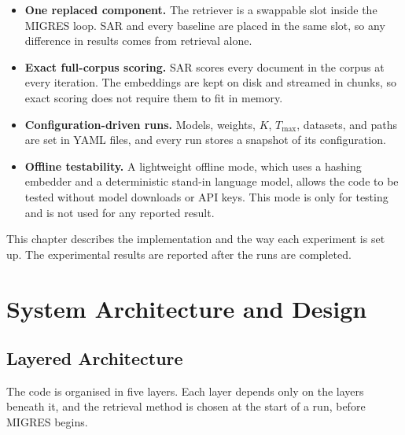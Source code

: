 \documentclass[12pt,a4paper]{report}
\begin{document}
\begin{itemize}[leftmargin=0.30in,itemsep=0.06in]
\item \textbf{One replaced component.} The retriever is a swappable slot inside the MIGRES loop. SAR and every baseline are placed in the same slot, so any difference in results comes from retrieval alone.
\item \textbf{Exact full-corpus scoring.} SAR scores every document in the corpus at every iteration. The embeddings are kept on disk and streamed in chunks, so exact scoring does not require them to fit in memory.
\item \textbf{Configuration-driven runs.} Models, weights, $K$, $T_{\max}$, datasets, and paths are set in YAML files, and every run stores a snapshot of its configuration.
\item \textbf{Offline testability.} A lightweight offline mode, which uses a hashing embedder and a deterministic stand-in language model, allows the code to be tested without model downloads or API keys. This mode is only for testing and is not used for any reported result.
\end{itemize}

This chapter describes the implementation and the way each experiment is set up. The experimental results are reported after the runs are completed.

\section{System Architecture and Design}

\subsection{Layered Architecture}

The code is organised in five layers. Each layer depends only on the layers beneath it, and the retrieval method is chosen at the start of a run, before MIGRES begins.
\end{document}
